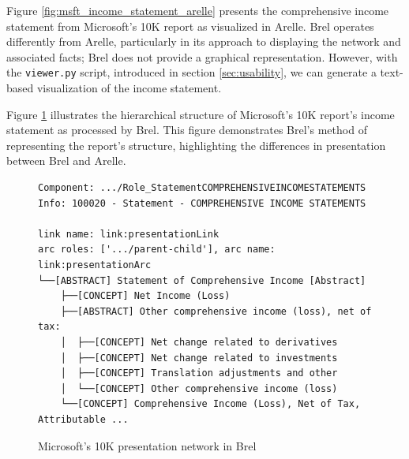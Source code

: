 
Figure \ref{fig:msft_income_statement_arelle} presents the comprehensive income statement from Microsoft's 10K report as visualized in Arelle.  
Brel operates differently from Arelle, particularly in its approach to displaying the network and associated facts; Brel does not provide a graphical representation.  
However, with the \texttt{viewer.py} script, introduced in section \ref{sec:usability},  
we can generate a text-based visualization of the income statement.

Figure \ref{fig:msft_income_statement_network} illustrates the hierarchical structure of Microsoft's 10K report's income statement as processed by Brel.  
This figure demonstrates Brel's method of representing the report's structure, highlighting the differences in presentation between Brel and Arelle.

\begin{figure}[H]
    \begin{lstlisting}[basicstyle=\small\ttfamily]
Component: .../Role_StatementCOMPREHENSIVEINCOMESTATEMENTS
Info: 100020 - Statement - COMPREHENSIVE INCOME STATEMENTS

link name: link:presentationLink
arc roles: ['.../parent-child'], arc name: link:presentationArc
└──[ABSTRACT] Statement of Comprehensive Income [Abstract]
    ├──[CONCEPT] Net Income (Loss)
    ├──[ABSTRACT] Other comprehensive income (loss), net of tax:
    │  ├──[CONCEPT] Net change related to derivatives
    │  ├──[CONCEPT] Net change related to investments
    │  ├──[CONCEPT] Translation adjustments and other
    │  └──[CONCEPT] Other comprehensive income (loss)
    └──[CONCEPT] Comprehensive Income (Loss), Net of Tax, Attributable ...
\end{lstlisting}
    \caption{Microsoft's 10K presentation network in Brel\cite{microsoft_edgar}}
    \label{fig:msft_income_statement_network}
\end{figure}

